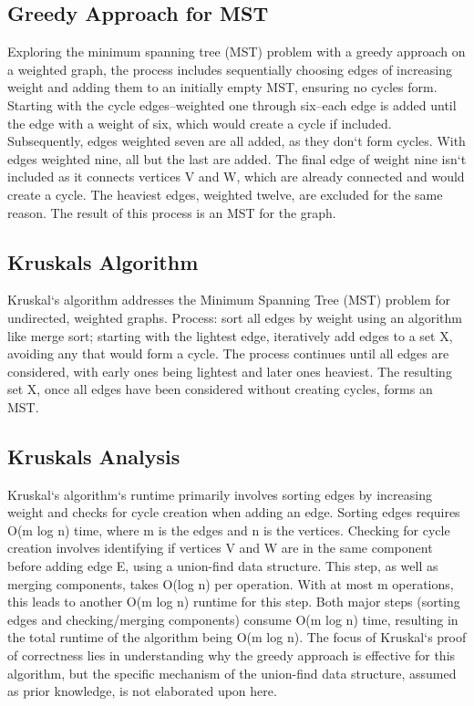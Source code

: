 \subsection*{Greedy Approach for MST}
Exploring the minimum spanning tree (MST) problem with a greedy approach on a weighted graph, the process includes sequentially choosing edges of increasing weight and adding them to an initially empty MST, ensuring no cycles form.
Starting with the cycle edges--weighted one through six--each edge is added until the edge with a weight of six, which would create a cycle if included.
Subsequently, edges weighted seven are all added, as they don`t form cycles.
With edges weighted nine, all but the last are added.
The final edge of weight nine isn`t included as it connects vertices V and W, which are already connected and would create a cycle.
The heaviest edges, weighted twelve, are excluded for the same reason.
The result of this process is an MST for the graph.

\subsection*{Kruskals Algorithm}
Kruskal`s algorithm addresses the Minimum Spanning Tree (MST) problem for undirected, weighted graphs.
Process: sort all edges by weight using an algorithm like merge sort; starting with the lightest edge, iteratively add edges to a set X, avoiding any that would form a cycle.
The process continues until all edges are considered, with early ones being lightest and later ones heaviest.
The resulting set X, once all edges have been considered without creating cycles, forms an MST\@.

\subsection*{Kruskals  Analysis}
Kruskal`s algorithm`s runtime primarily involves sorting edges by increasing weight and checks for cycle creation when adding an edge.
Sorting edges requires O(m log n) time, where m is the edges and n is the vertices.
Checking for cycle creation involves identifying if vertices V and W are in the same component before adding edge E, using a union-find data structure.
This step, as well as merging components, takes O(log n) per operation.
With at most m operations, this leads to another O(m log n) runtime for this step.
Both major steps (sorting edges and checking/merging components) consume O(m log n) time, resulting in the total runtime of the algorithm being O(m log n).
The focus of Kruskal`s proof of correctness lies in understanding why the greedy approach is effective for this algorithm, but the specific mechanism of the union-find data structure, assumed as prior knowledge, is not elaborated upon here.

